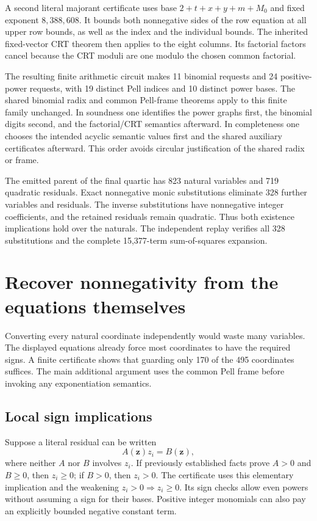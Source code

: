 A second literal majorant certificate uses base $2+t+x+y+m+M_0$ and
fixed exponent $8,388,608$.  It bounds both nonnegative sides of the
row equation at all upper row bounds, as well as the index and the
individual bounds.  The inherited fixed-vector CRT theorem then applies
to the eight columns.  Its factorial factors cancel because the CRT
moduli are one modulo the chosen common factorial.

The resulting finite arithmetic circuit makes 11 binomial requests and
24 positive-power requests, with 19 distinct Pell indices and 10 distinct
power bases.  The shared binomial radix and common Pell-frame theorems
apply to this finite family unchanged.  In soundness one identifies the
power graphs first, the binomial digits second, and the factorial/CRT
semantics afterward.  In completeness one chooses the intended acyclic
semantic values first and the shared auxiliary certificates afterward.
This order avoids circular justification of the shared radix or frame.

The emitted parent of the final quartic has 823 natural variables and
719 quadratic residuals.  Exact nonnegative monic substitutions eliminate
328 further variables and residuals.  The inverse substitutions have
nonnegative integer coefficients, and the retained residuals remain
quadratic.  Thus both existence implications hold over the naturals.
The independent replay verifies all 328 substitutions and the complete
15,377-term sum-of-squares expansion.

\section{Recover nonnegativity from the equations themselves}
\label{sec:frame-domain}

Converting every natural coordinate independently would waste many
variables.  The displayed equations already force most coordinates to
have the required signs.  A finite certificate shows that guarding only
170 of the 495 coordinates suffices.  The main additional argument uses
the common Pell frame before invoking any exponentiation semantics.

\subsection{Local sign implications}

Suppose a literal residual can be written
\[
 A(\mathbf z)z_i=B(\mathbf z),
\]
where neither $A$ nor $B$ involves $z_i$.  If previously established facts
prove $A>0$ and $B\ge0$, then $z_i\ge0$; if $B>0$, then $z_i>0$.
The certificate uses this elementary implication and the weakening
$z_i>0\Rightarrow z_i\ge0$.  Its sign checks allow even powers without
assuming a sign for their bases.  Positive integer monomials can also
pay an explicitly bounded negative constant term.

